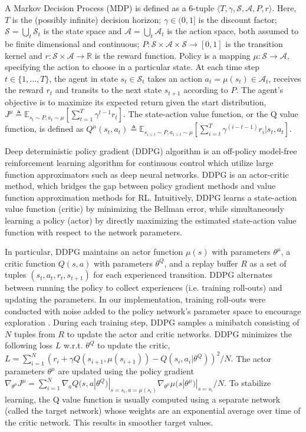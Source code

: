 \documentclass{article}
\begin{document}
A Markov Decision Process (MDP) is defined as a 6-tuple $\langle T, \gamma, \mathcal{S}, \mathcal{A},  P, r\rangle$. Here, $T$ is the (possibly infinite) decision horizon; $\gamma\in(0,1]$ is the discount factor; $\mathcal{S}=\bigcup_t \mathcal{S}_t$ is the state space and $\mathcal{A}=\bigcup_t \mathcal{A}_t$ is the action space, both assumed to be finite dimensional and continuous; $P:\mathcal{S}\times\mathcal{A}\times\mathcal{S}\rightarrow[0,1]$ is the transition kernel and $r: \mathcal{S}\times\mathcal{A}\rightarrow\mathbb{R}$ is the reward function. Policy is a mapping $\mu: \mathcal{S}\rightarrow \mathcal{A}$, specifying the action to choose in a particular state.  At each time step $t\in\{1,\dots,T\}$, the agent in state $s_t\in\mathcal{S}_t$ takes an action $a_t=\mu(s_t)\in\mathcal{A}_t$, receives the reward $r_t$ and transits to the next state $s_{t+1}$ according to $P.$ The agent's objective is to maximize its expected return given the start distribution,
$
    J^\mu\triangleq\mathbb{E}_{s_t\sim P, a_t\sim \mu}[\sum_{t=1}^T \gamma^{t-1}r_t].
$
The state-action value function, or the Q value function, is defined as 
$
    Q^\mu(s_t,a_t)\triangleq\mathbb{E}_{s_{i>t}\sim P, a_{i>t}\sim \mu}[\sum_{i=t}^T\gamma^{(i-t-1)}r_i|s_t,a_t].
$

Deep deterministic policy {gradient} (DDPG) algorithm \cite{lillicrap2015continuous} is an off-policy model-free reinforcement learning algorithm for continuous control which utilize large function approximators such as {deep} neural networks. DDPG is an actor-critic method, which bridges the gap between policy gradient methods and value function approximation methods for RL. Intuitively, DDPG learns a state-action value function (critic) by minimizing the Bellman error, while simultaneously learning a policy (actor) by directly maximizing the estimated state-action value function with respect to the network parameters. 

In particular, DDPG maintains an actor function $\mu(s)$ with parameters $\theta^\mu$, a critic function $Q(s,a)$ with parameters $\theta^Q$, and a replay buffer $R$ as a set of tuples $(s_t, a_t, r_t, s_{t+1})$ for each experienced transition. DDPG alternates between running the policy to collect experiences (i.e. training roll-outs) and updating the parameters. In our implementation, training roll-outs were conducted with noise added to the policy network's parameter space to encourage exploration \cite{plappert2017parameter}. During each training step, DDPG samples a minibatch consisting of $N$ tuples from $R$ to update the actor and critic networks. DDPG minimizes the following loss $L$ w.r.t. $\theta^Q$ to update the critic, 
$
    L=\sum_{i=1}^N (r_i +\gamma Q(s_{i+1}, \mu(s_{i+1})) -
		Q(s_i, a_i | \theta^Q))^2/N.
$
The actor parameters $\theta^\mu$ are updated using the policy gradient
$
\nabla_{\theta^{\mu}} J^\mu =\sum_{i=1}^N
		\nabla_{a} Q(s, a | \theta^Q)|_{s = s_i, a = \mu(s_i)}\nabla_{\theta^\mu} \mu(s | \theta^\mu)|_{s =s_i}/N.
$
To stabilize learning, the Q value function is usually computed using a separate network (called the target network) whose weights are an exponential average over time of the critic network. This results in smoother target values.
\end{document}
